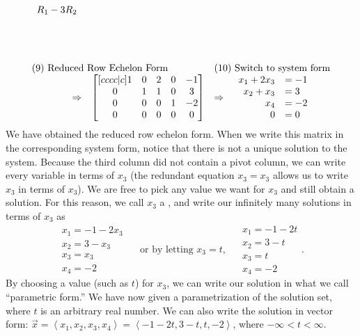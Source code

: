 {\begin{example}
{$$\begin{array}{rlcl}
  \begin{array}{lr} R_1-3R_2 \\ \ \\ \ \\ \ \end{array}
\\ \\ 
\multicolumn{2}{l}{\text{(9) Reduced Row Echelon Form}}&
\multicolumn{2}{l}{\text{(10) Switch to system form}}\\
\Rightarrow&
\begin{bmatrix}[cccc|c]
  1 & 0 & 2 & 0 & -1 \\
 0 & 1 & 1 & 0 & 3 \\
 0 & 0 & 0 & 1 & -2 \\
 0 & 0 & 0 & 0 & 0
\end{bmatrix}
&\Rightarrow& 
\begin{array}{rl}
x_1+2x_3&=-1\\
x_2+x_3&=3\\
x_4&=-2\\
0&=0
\end{array}
\end{array}
$$}We have obtained the reduced row echelon form. 
When we write this matrix in the corresponding system form, notice that there is not a unique solution to the system. Because the third column did not contain a pivot column, we can write every variable in terms of $x_3$ (the redundant equation $x_3=x_3$ allows us to write $x_3$ in terms of $x_3$). We are free to pick any value we want for $x_3$ and still obtain a solution. For this reason, we call $x_3$ a ,  and write our infinitely many solutions in terms of $x_3$ as 
$$
\begin{array}{ll}
x_1=-1-2x_3\\
x_2=3-x_3\\
x_3=x_3\\
x_4=-2
\end{array}
\quad \text{ or by letting $x_3=t$, }\quad
\begin{array}{ll}
x_1=-1-2t\\
x_2=3-t\\
x_3=t\\
x_4=-2
\end{array}
.
$$
By choosing a value (such as $t$) for $x_3$, we can write our solution in what we call ``parametric form.'' We have now given a parametrization of the solution set, where $t$ is an arbitrary real number.  We can also write the solution in vector form: $\vec x=\left<x_1,x_2,x_3,x_4\right>=\left< -1-2t, 3-t, t, -2\right>$, where $-\infty<t<\infty$. 
\end{example}

}
